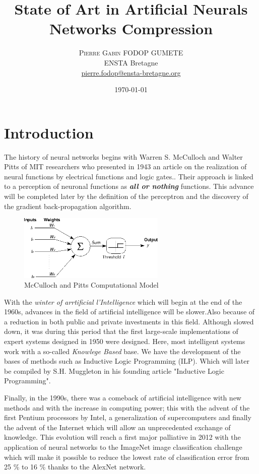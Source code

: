 \documentclass[twoside,twocolumn]{article}
\title{State of Art in Artificial Neurals Networks Compression} %
\author{%
\textsc{Pierre Gabin FODOP GUMETE} \\[1ex] %
\normalsize ENSTA Bretagne \\ %
\normalsize \href{mailto:pierre.fodop@ensta-bretagne.org}{pierre.fodop@ensta-bretagne.org} %
}
\date{\today} %
\begin{document}
\maketitle


\section{Introduction}
The history of neural networks begins with Warren S. McCulloch and Walter Pitts of MIT researchers who presented in 1943 an
article on the realization of neural functions by electrical functions and logic gates.\cite{warren1}.
Their approach is linked to a perception of neuronal functions as {\bf\textit{all or nothing}} functions. 
This advance will be completed later by the definition of the perceptron\cite{RosenBlatt1} and the discovery of the gradient 
back-propagation algorithm\cite{Rumelhart1}.

\begin{figure}[h]
\centering
\includegraphics[width=70mm]{CulochNeurone.png}
\caption{McCulloch and Pitts Computational Model}
\label{SimpleNeuron}
\end{figure}

With the \textit{winter of arrtificial l'Intelligence} which will begin at the end of the 1960s, advances in the field of 
artificial intelligence will be slower.Also because of a reduction in both public and private investments in this field. 
Although slowed down, it was during this period that the first large-scale implementations of expert systems designed in 
1950 were designed. Here, most intelligent systems work with a so-called \textit{Knowlege Based} base. We have the development 
of the bases of methods such as Inductive Logic Programming (ILP)\cite{Muggleton1}\cite{Ehud1}. Which will later be compiled 
by S.H. Muggleton in his founding article "Inductive Logic Programming"\cite{Muggleton2}.

Finally, in the 1990s, there was a comeback of artificial intelligence with new methods and with the increase in computing power; 
this with the advent of the first Pentium processors by Intel, a generalization of supercomputers and finally the advent of the 
Internet which will allow an unprecedented exchange of knowledge. This evolution will reach a first major palliative in 2012 with 
the application of neural networks to the ImageNet image classification challenge which will make it possible to reduce the lowest 
rate of classification error from 25 \% to 16 \% thanks to the AlexNet network\cite{Rajat1}. 
\end{document}
